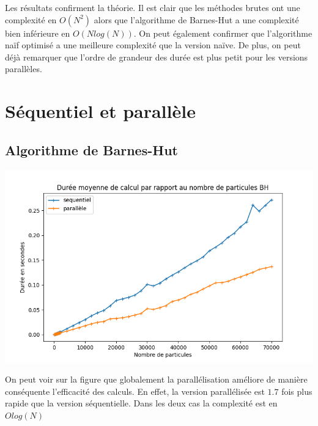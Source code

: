 \par Les résultats confirment la théorie. Il est clair que les méthodes brutes ont une complexité en $O(N^2)$ alors que l'algorithme de Barnes-Hut a une complexité bien inférieure en $O(Nlog(N))$.
On peut également confirmer que l'algorithme naïf optimisé a une meilleure complexité que la version naïve.
De plus, on peut déjà remarquer que l'ordre de grandeur des durée est plus petit pour les versions parallèles.
 
\section{Séquentiel et parallèle}

\subsection{Algorithme de Barnes-Hut}
\begin{center}
\includegraphics[scale=0.6]{./resultats/comparison_BH.png}
\captionsetup{hypcap=false}
\label{fig13}
\end{center}

On peut voir sur la figure que globalement la parallélisation améliore de manière conséquente l'efficacité des calculs. En effet, la version parallélisée est $1.7$ fois plus rapide que la version séquentielle. Dans les deux cas la complexité est en $Olog(N)$

